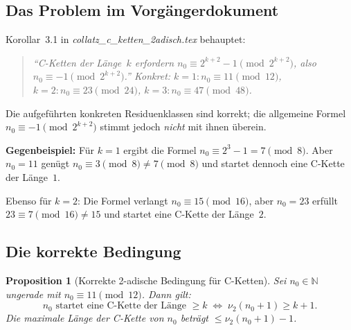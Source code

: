 \documentclass[12pt,a4paper]{article}
\newtheorem{proposition}[definition]{Proposition}
\newcommand{\vii}{\nu_2}
\newcommand{\N}{\mathbb{N}}
\begin{document}
	\subsection{Das Problem im Vorgängerdokument}
	
	Korollar~3.1 in \textit{collatz\_c\_ketten\_2adisch.tex} behauptet:
	\begin{quote}
		\emph{``C-Ketten der Länge~$k$ erfordern $n_0 \equiv 2^{k+2}-1 \pmod{2^{k+2}}$,
			also $n_0 \equiv -1 \pmod{2^{k+2}}$.''
			Konkret: $k=1\colon n_0 \equiv 11 \pmod{12}$,\; $k=2\colon n_0 \equiv 23 \pmod{24}$,\; $k=3\colon n_0 \equiv 47 \pmod{48}$.}
	\end{quote}
	Die aufgeführten konkreten Residuenklassen sind korrekt; die allgemeine Formel
	$n_0 \equiv -1 \pmod{2^{k+2}}$ stimmt jedoch \emph{nicht} mit ihnen überein.
	
	\begin{tcolorbox}[korrektur]
		\textbf{Gegenbeispiel:} Für $k=1$ ergibt die Formel $n_0 \equiv 2^3-1 = 7 \pmod{8}$.
		Aber $n_0 = 11$ genügt $n_0 \equiv 3 \pmod{8} \neq 7 \pmod{8}$ und startet
		dennoch eine C-Kette der Länge~$1$.
		
		Ebenso für $k=2$: Die Formel verlangt $n_0 \equiv 15 \pmod{16}$, aber $n_0 = 23$
		erfüllt $23 \equiv 7 \pmod{16} \neq 15$ und startet eine C-Kette der Länge~$2$.
	\end{tcolorbox}
	
	\subsection{Die korrekte Bedingung}
	
	\begin{proposition}[Korrekte 2-adische Bedingung für C-Ketten]
		\label{prop:korrekt}
		Sei $n_0 \in \N$ ungerade mit $n_0 \equiv 11 \pmod{12}$. Dann gilt:
		\[
		\text{$n_0$ startet eine C-Kette der Länge $\geq k$}
		\;\Longleftrightarrow\;
		\vii(n_0+1) \geq k+1.
		\]
		Die maximale Länge der C-Kette von $n_0$ beträgt $\leq \vii(n_0+1) - 1$.
	\end{proposition}
	
\end{document}
